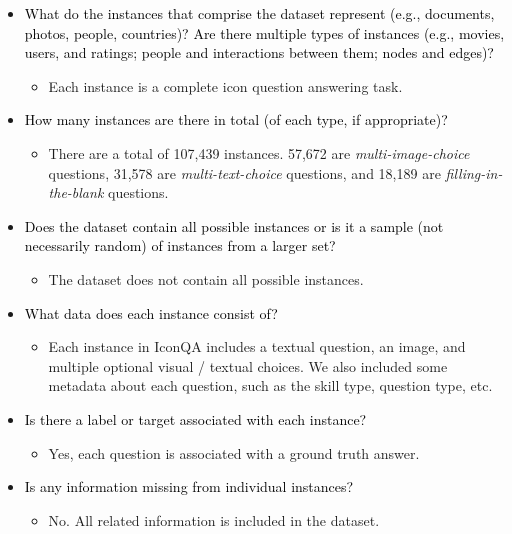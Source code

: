 \documentclass{article}
\newcommand{\ques}[1]{\textcolor{black}{#1}}
\begin{document}
\begin{itemize}
    \item \ques{What do the instances that comprise the dataset represent (e.g.,
documents, photos, people, countries)? Are there multiple types of
instances (e.g., movies, users, and ratings; people and interactions between them; nodes and edges)?}
    \begin{itemize}
        \item Each instance is a complete icon question answering task.
    \end{itemize}
    \item \ques{How many instances are there in total (of each type, if appropriate)?}
    \begin{itemize}
        \item There are a total of 107,439 instances. 57,672 are \textit{multi-image-choice} questions, 31,578 are \textit{multi-text-choice} questions, and 18,189 are \textit{filling-in-the-blank} questions.
    \end{itemize}
    \item \ques{Does the dataset contain all possible instances or is it a sample
(not necessarily random) of instances from a larger set?}
    \begin{itemize}
        \item The dataset does not contain all possible instances.
    \end{itemize}
    \item \ques{What data does each instance consist of? }
    \begin{itemize}
        \item Each instance in IconQA includes a textual question, an image, and multiple optional visual / textual choices. We also included some metadata about each question, such as the skill type, question type, etc.
    \end{itemize}
    \item \ques{Is there a label or target associated with each instance?}
    \begin{itemize}
        \item Yes, each question is associated with a ground truth answer.
    \end{itemize}
    \item \ques{Is any information missing from individual instances?}
    \begin{itemize}
        \item No. All related information is included in the dataset.
    \end{itemize}

\end{itemize}
\end{document}
